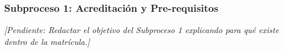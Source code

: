 \subsubsection{Subproceso 1: Acreditación y Pre-requisitos}

\textit{[Pendiente: Redactar el objetivo del Subproceso 1 explicando para qué existe dentro de la matrícula.]}

